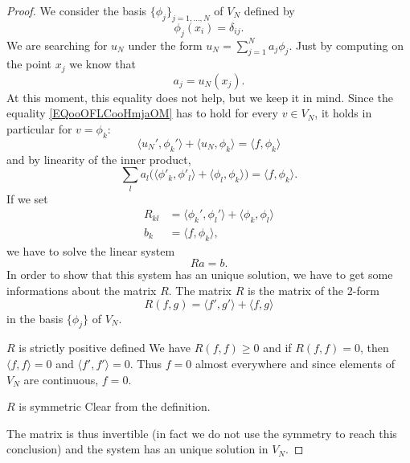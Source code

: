 \begin{proof}
    We consider the basis \( \{ \phi_j \}_{j=1,\ldots, N}\) of \( V_N\) defined by
    \begin{equation}
        \phi_j(x_i)=\delta_{ij}.
    \end{equation}
    We are searching for \( u_N\) under the form \( u_N=\sum_{j=1}^Na_j\phi_j\). Just by computing on the point \( x_j\) we know that
    \begin{equation}
        a_j=u_N(x_j).
    \end{equation}
    At this moment, this equality does not help, but we keep it in mind. Since the equality \eqref{EQooOFLCooHmjaOM} has to hold for every \( v \in V_N\), it holds in particular for \( v=\phi_k\):
    \begin{equation}
        \langle u_N', \phi_k'\rangle +\langle u_N, \phi_k\rangle =\langle f, \phi_k\rangle 
    \end{equation}
    and by linearity of the inner product,
    \begin{equation}
        \sum_la_l\big( \langle \phi'_k, \phi'_l\rangle +\langle \phi_l, \phi_k\rangle  \big)=\langle f, \phi_k\rangle .
    \end{equation}
    If we set
    \begin{subequations}
        \begin{align}
            R_{kl}&=\langle \phi_k', \phi_l'\rangle +\langle \phi_k, \phi_l\rangle \\
            b_k&=\langle f, \phi_k\rangle,
        \end{align}
    \end{subequations}
    we have to solve the linear system
    \begin{equation}
        Ra=b.
    \end{equation}
    In order to show that this system has an unique solution, we have to get some informations about the matrix \( R\). The matrix \( R\) is the matrix of the \( 2\)-form
    \begin{equation}
        R(f,g)=\langle f', g'\rangle +\langle f, g\rangle 
    \end{equation}
    in the basis \( \{ \phi_j \}\) of \( V_N\).

    \begin{subproof}
        \item[\( R\) is strictly positive defined]
            We have \( R(f,f)\geq 0\) and if \( R(f,f)=0\), then \( \langle f, f\rangle =0\) and \( \langle f', f'\rangle =0\). Thus \( f=0\) almost everywhere and since elements of \( V_N\) are continuous, \( f=0\).
        \item[\( R\) is symmetric] Clear from the definition.
    \end{subproof}
    
    The matrix is thus invertible (in fact we do not use the symmetry to reach this conclusion) and the system has an unique solution in \( V_N\).
    
\end{proof}

